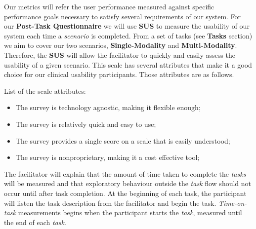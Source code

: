 Our metrics will refer the user performance measured against specific performance goals necessary to satisfy several requirements of our system. For our \textbf{Post-Task Questionnaire} we will use \textbf{SUS} to measure the usability of our system each time a \textit{scenario} is completed. From a set of tasks (see \textbf{Tasks} section) we aim to cover our two scenarios, \textbf{Single-Modality} and \textbf{Multi-Modality}. Therefore, the \textbf{SUS} will allow the facilitator to quickly and easily assess the usability of a given scenario. This scale has several attributes \cite{bangor2008empirical} that make it a good choice for our clinical usability participants. Those attributes are as follows.

\hfill


List of the scale attributes:


\hfill

\begin{itemize}
  \item The survey is technology agnostic, making it flexible enough;
  \item The survey is relatively quick and easy to use;
  \item The survey provides a single score on a scale that is easily understood;
  \item The survey is nonproprietary, making it a cost effective tool;
\end{itemize}

\hfill


\clearpage

The facilitator will explain that the amount of time taken to complete the \textit{tasks} will be measured and that exploratory behaviour outside the \textit{task} flow should not occur until after task completion. At the beginning of each task, the participant will listen the task description from the facilitator and begin the task. \textit{Time-on-task} measurements begins when the participant starts the \textit{task}, measured until the end of each \textit{task}.




